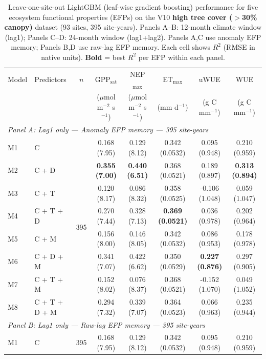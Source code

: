 \begin{table}[htbp]
\centering
\caption{Leave-one-site-out LightGBM (leaf-wise gradient boosting) performance for five ecosystem functional properties (EFPs) on the V10 \textbf{high tree cover ($>$30\% canopy)} dataset (93 sites, 395 site-years). Panels A--B: 12-month climate window (lag1); Panels C--D: 24-month window (lag1+lag2). Panels A,C use anomaly EFP memory; Panels B,D use raw-lag EFP memory. Each cell shows $R^2$ (RMSE in native units). \textbf{Bold} = best $R^2$ per EFP within each panel.}
\label{tab:LGB_LOSO_v10_filtered}
\footnotesize
\setlength{\tabcolsep}{4pt}
\begin{tabular}{llcccccc}
\toprule
Model & Predictors & $n$ & GPP$_\mathrm{sat}$ & NEP$_\mathrm{max}$ & ET$_\mathrm{max}$ & uWUE & WUE \\
  &  &  & ($\mu$mol m$^{-2}$ s$^{-1}$) & ($\mu$mol m$^{-2}$ s$^{-1}$) & (mm d$^{-1}$) & (g C mm$^{-1}$) & (g C mm$^{-1}$) \\
\midrule
\multicolumn{8}{l}{\textit{Panel A: Lag1 only --- Anomaly EFP memory --- 395 site-years}} \\
\midrule
M1 & C & \multirow{8}{*}{395} & 0.168 (7.95) & 0.129 (8.12) & 0.342 (0.0532) & 0.095 (0.948) & 0.210 (0.959) \\
M2 & C + D &  & \textbf{0.355 (7.00)} & \textbf{0.440 (6.51)} & 0.368 (0.0521) & 0.189 (0.897) & \textbf{0.313 (0.894)} \\
M3 & C + T &  & 0.120 (8.17) & 0.086 (8.32) & 0.358 (0.0525) & -0.106 (1.048) & 0.059 (1.047) \\
M4 & C + T + D &  & 0.270 (7.44) & 0.328 (7.13) & \textbf{0.369 (0.0521)} & 0.036 (0.978) & 0.202 (0.964) \\
M5 & C + M &  & 0.156 (8.00) & 0.146 (8.05) & 0.342 (0.0532) & 0.086 (0.953) & 0.178 (0.978) \\
M6 & C + D + M &  & 0.341 (7.07) & 0.422 (6.62) & 0.350 (0.0529) & \textbf{0.227 (0.876)} & 0.297 (0.905) \\
M7 & C + T + M &  & 0.152 (8.02) & 0.076 (8.37) & 0.368 (0.0521) & -0.152 (1.070) & 0.049 (1.052) \\
M8 & C + T + D + M &  & 0.294 (7.32) & 0.339 (7.07) & 0.364 (0.0523) & 0.066 (0.963) & 0.235 (0.944) \\
\midrule
\multicolumn{8}{l}{\textit{Panel B: Lag1 only --- Raw-lag EFP memory --- 395 site-years}} \\
\midrule
M1 & C & \multirow{8}{*}{395} & 0.168 (7.95) & 0.129 (8.12) & 0.342 (0.0532) & 0.095 (0.948) & 0.210 (0.959) \\

\end{tabular}
\end{table}
